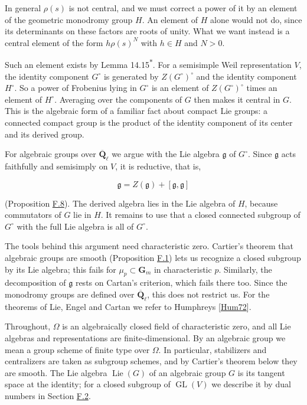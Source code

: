 \documentclass[11pt]{article}
\newcommand{\bpout}[1]{#1\textsuperscript{\hyperlink{bp-outside}{\ensuremath{\ast}}}}
\providecommand{\GL}{}\renewcommand{\GL}{\operatorname{GL}}
\begin{document}
In general \(\rho(s)\) is not central, and we must correct a power of it by an element of the geometric monodromy group \(H\). An element of \(H\) alone would not do, since its determinants on these factors are roots of unity. What we want instead is a central element of the form \(h\rho(s)^N\) with \(h\in H\) and \(N>0\).

Such an element exists by Lemma \bpout{14.15}. For a semisimple Weil representation \(V\), the identity component \(G^\circ\) is generated by \(Z(G^\circ)^\circ\) and the identity component \(H^\circ\). So a power of Frobenius lying in \(G^\circ\) is an element of \(Z(G^\circ)^\circ\) times an element of \(H^\circ\). Averaging over the components of \(G\) then makes it central in \(G\). This is the algebraic form of a familiar fact about compact Lie groups: a connected compact group is the product of the identity component of its center and its derived group.

For algebraic groups over \(\overline{\mathbf Q}_\ell\) we argue with the Lie algebra \(\mathfrak g\) of \(G^\circ\). Since \(\mathfrak g\) acts faithfully and semisimply on \(V\), it is reductive, that is,

\[
\mathfrak g=Z(\mathfrak g)+[\mathfrak g,\mathfrak g]
\]

(Proposition \hyperref[bp347]{F.8}). The derived algebra lies in the Lie algebra of \(H\), because commutators of \(G\) lie in \(H\). It remains to use that a closed connected subgroup of \(G^\circ\) with the full Lie algebra is all of \(G^\circ\).

The tools behind this argument need characteristic zero. Cartier's theorem that algebraic groups are smooth (Proposition \hyperref[bp324]{F.1}) lets us recognize a closed subgroup by its Lie algebra; this fails for \(\mu_p\subset\mathbf G_m\) in characteristic \(p\). Similarly, the decomposition of \(\mathfrak g\) rests on Cartan's criterion, which fails there too. Since the monodromy groups are defined over \(\overline{\mathbf Q}_\ell\), this does not restrict us. For the theorems of Lie, Engel and Cartan we refer to Humphreys [\hyperref[bp356]{Hum72}].

Throughout, \(\Omega\) is an algebraically closed field of characteristic zero, and all Lie algebras and representations are finite-dimensional. By an algebraic group we mean a group scheme of finite type over \(\Omega\). In particular, stabilizers and centralizers are taken as subgroup schemes, and by Cartier's theorem below they are smooth. The Lie algebra \(\operatorname{Lie}(G)\) of an algebraic group \(G\) is its tangent space at the identity; for a closed subgroup of \(\GL(V)\) we describe it by dual numbers in Section \hyperref[bp329]{F.2}.
\end{document}
